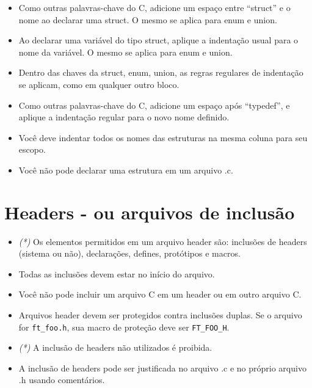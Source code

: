 \documentclass{42-pt}
\begin{document}
        \begin{itemize}

        \item Como outras palavras-chave do C, adicione um espaço entre ``struct'' e o nome
          ao declarar uma struct. O mesmo se aplica para enum e union.

        \item Ao declarar uma variável do tipo struct, aplique a indentação usual para o nome
          da variável. O mesmo se aplica para enum e union.

        \item Dentro das chaves da struct, enum, union, as regras regulares de indentação
          se aplicam, como em qualquer outro bloco.

        \item Como outras palavras-chave do C, adicione um espaço após ``typedef'',
          e aplique a indentação regular para o novo nome definido.

        \item Você deve indentar todos os nomes das estruturas na mesma coluna para seu escopo.

        \item Você não pode declarar uma estrutura em um arquivo .c.

        \end{itemize}
        \newpage


    \section{Headers - ou arquivos de inclusão}

      \begin{itemize}

          \item \textit{(*)} Os elementos permitidos em um arquivo header são:
              inclusões de headers (sistema ou não), declarações, defines,
              protótipos e macros.

          \item Todas as inclusões devem estar no início do arquivo.

          \item Você não pode incluir um arquivo C em um header ou em outro arquivo C.

          \item Arquivos header devem ser protegidos contra inclusões duplas. Se o arquivo for
          \texttt{ft\_foo.h}, sua macro de proteção deve ser \texttt{FT\_FOO\_H}.

          \item \textit{(*)} A inclusão de headers não utilizados é proibida.

          \item A inclusão de headers pode ser justificada no arquivo .c e no próprio arquivo .h
            usando comentários.

      \end{itemize}
\end{document}
